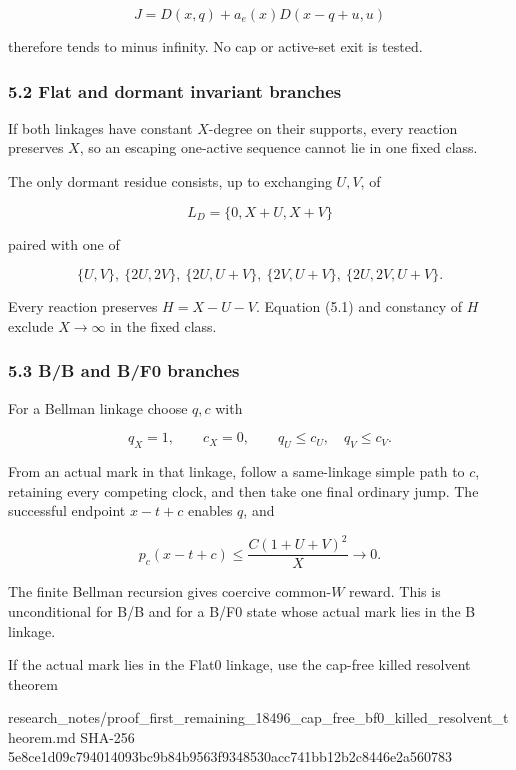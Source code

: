 \[
                    J=D(x,q)+a_e(x)D(x-q+u,u)        \tag{5.2}
\]

therefore tends to minus infinity. No cap or active-set exit is tested.

\subsubsection{5.2 Flat and dormant invariant
branches}

If both linkages have constant \(X\)-degree on their supports, every
reaction preserves \(X\), so an escaping one-active sequence cannot lie
in one fixed class.

The only dormant residue consists, up to exchanging \(U,V\), of

\[
 L_D=\{0,X+U,X+V\}                                  \tag{5.3}
\]

paired with one of

\[
 \{U,V\},\ \{2U,2V\},\ \{2U,U+V\},\
 \{2V,U+V\},\ \{2U,2V,U+V\}.                       \tag{5.4}
\]

Every reaction preserves \(H=X-U-V\). Equation (5.1) and constancy of
\(H\) exclude \(X\to\infty\) in the fixed class.

\subsubsection{5.3 B/B and B/F0 branches}

For a Bellman linkage choose \(q,c\) with

\[
 q_X=1,\qquad c_X=0,\qquad q_U\le c_U,\quad q_V\le c_V. \tag{5.5}
\]

From an actual mark in that linkage, follow a same-linkage simple path
to \(c\), retaining every competing clock, and then take one final
ordinary jump. The successful endpoint \(x-t+c\) enables \(q\), and

\[
 p_c(x-t+c)\le \frac{C(1+U+V)^2}{X}\longrightarrow0. \tag{5.6}
\]

The finite Bellman recursion gives coercive common-\(W\) reward. This is
unconditional for B/B and for a B/F0 state whose actual mark lies in the
B linkage.

If the actual mark lies in the Flat0 linkage, use the cap-free killed
resolvent theorem

\begin{CodeBlock}
research_notes/proof_first_remaining_18496_cap_free_bf0_killed_resolvent_theorem.md
SHA-256 5e8ce1d09c794014093bc9b84b9563f9348530acc741bb12b2c8446e2a560783
\end{CodeBlock}

